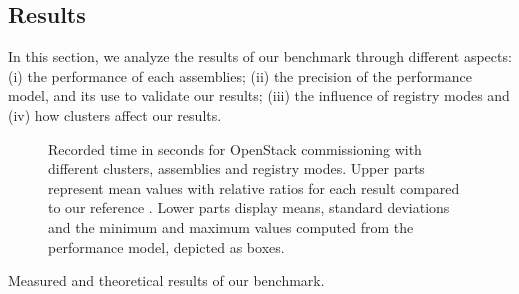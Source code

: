 \subsection{Results}

In this section, we analyze the results of our benchmark through
different aspects: (i) the performance of each assemblies; (ii) the
precision of the performance model, and its use to validate our
results; (iii) the influence of registry modes and (iv) how clusters
affect our results.

\begin{figure}[t!]
  \begin{center}
    \def\svgwidth{\columnwidth}
    \def\svgwidth{\columnwidth}
    \caption{Recorded time in seconds for OpenStack commissioning with different
    clusters, assemblies and registry modes. Upper parts represent mean values
    with relative ratios for each result compared to our reference \ansass.
    Lower parts display means, standard deviations and the minimum and maximum
    values computed from the performance model, depicted as boxes.}
    \label{fig:openstack_results}
  \end{center}
\end{figure}

\begin{table}
    \begin{center}
        
        \caption{Measured and theoretical results of our benchmark.}
        \label{tab:openstack_results}
    \end{center}
\end{table}

